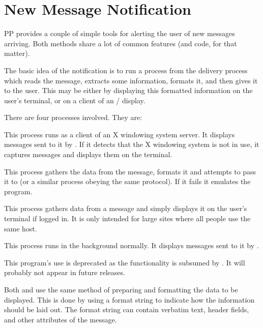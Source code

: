 \section{New Message Notification}

PP provides a couple of simple tools for alerting the user of new
messages arriving. Both methods share a lot of common features (and
code, for that matter).

The basic idea of the notification is to run a process from the
delivery process which reads the message, extracts some information,
formats it, and then gives it to the user. This may be either by
displaying this formatted information on the user's terminal, or on a
client of an \xwindows/
display.

There are four processes involved. They are:
\begin{describe}

\item[\verb|xalert|:]	This process runs as a client of an X
windowing system server. It displays messages sent to it by
. If it detects that the X windowing system is not in
use, it captures messages and displays them on the terminal.

\item[\verb|flagmail|:]	This process gathers the data from the
message, formats it and \linebreak[3] attempts to pass it to
 (or a similar process obeying the same protocol). If it
fails it emulates the  program.

\item[\verb|ttyalert|:]	This process gathers data from a
message and simply displays it on the user's terminal if logged in.
It is only intended for large sites where all people use the same
host. 

\item[\verb|ttybiff|:]	This process runs in the background normally.
It displays messages sent to it by . 

This program's use is deprecated as the functionality is subsumed by
. It will probably not appear in future releases.

\end{describe}

Both  and  use the same method of preparing
and formatting the data to be displayed. This is done by using a
format string to indicate how the information should be laid out. The
format string can contain verbatim text,  header fields, and other
attributes of the message.

